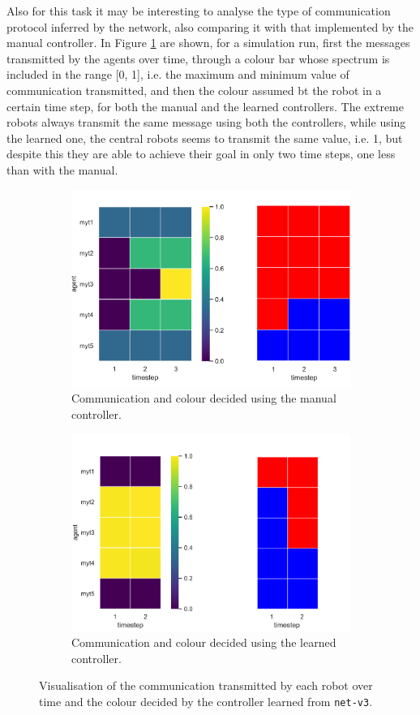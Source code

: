 Also for this task it may be interesting to analyse the type of communication 
protocol inferred by the network, also comparing it with that implemented by the 
manual controller. In Figure \ref{fig:net-v3commcolour} are shown, for a 
simulation run, first the messages transmitted by the agents over time, through a 
colour bar whose spectrum is included in the range [0, 1], i.e. the maximum and 
minimum value of communication transmitted, and then the colour assumed bt 
the robot in a certain time step, for both the manual and the learned controllers.
The extreme robots always transmit the same message using both the controllers, 
while using the learned one, the central robots seems to transmit the same value, 
i.e. 1, but despite this they are able to achieve their goal in only two time steps, 
one less than with the manual.
\begin{figure}[!htb]
		\begin{subfigure}[h]{\textwidth}
			\centering
			\includegraphics[width=.45\textwidth]{contents/images/net-v3/manual-0}
			\caption{Communication and colour decided using the manual controller.}
		\end{subfigure}
		\hspace*{\fill}%
		\vspace*{8pt}%
		\hspace*{\fill}%
		\begin{subfigure}[h]{\textwidth}
			\centering			
			\includegraphics[width=.45\textwidth]{contents/images/net-v3/learned-0}
			\caption{Communication and colour decided using the learned controller.}
		\end{subfigure}
	\caption[Evaluation of the communication learned by 
	\texttt{net-v3}.]{Visualisation of the communication transmitted by each 
	robot over time and the colour decided by the controller learned from 
	\texttt{net-v3}.}	
	\label{fig:net-v3commcolour}
\end{figure}

